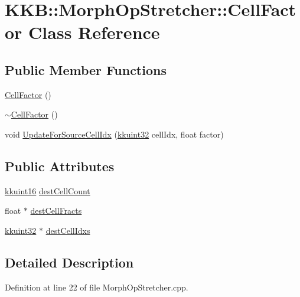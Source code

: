\hypertarget{class_morph_op_stretcher_1_1_cell_factor}{}\section{K\+KB\+:\+:Morph\+Op\+Stretcher\+:\+:Cell\+Factor Class Reference}
\label{class_morph_op_stretcher_1_1_cell_factor}
\subsection*{Public Member Functions}
\begin{DoxyCompactItemize}
\item 
\hyperlink{class_morph_op_stretcher_1_1_cell_factor_af7b5fd53ab9efc21af36ae9fb8186c39}{Cell\+Factor} ()
\item 
\hyperlink{class_morph_op_stretcher_1_1_cell_factor_a72f0f29acfccf22fef775cfc5b23344d}{$\sim$\+Cell\+Factor} ()
\item 
void \hyperlink{class_morph_op_stretcher_1_1_cell_factor_a42f00b31427b26dc6409b75eaa581e03}{Update\+For\+Source\+Cell\+Idx} (\hyperlink{namespace_k_k_b_af8d832f05c54994a1cce25bd5743e19a}{kkuint32} cell\+Idx, float factor)
\end{DoxyCompactItemize}
\subsection*{Public Attributes}
\begin{DoxyCompactItemize}
\item 
\hyperlink{namespace_k_k_b_aa8c7d4d30381c8a0b6fce68974a9c8a9}{kkuint16} \hyperlink{class_morph_op_stretcher_1_1_cell_factor_a4ea39788e14a1b8d0ea4bf0634991f81}{dest\+Cell\+Count}
\item 
float $\ast$ \hyperlink{class_morph_op_stretcher_1_1_cell_factor_aaa0ecc31b4ade20727b2a6fa61bf938c}{dest\+Cell\+Fracts}
\item 
\hyperlink{namespace_k_k_b_af8d832f05c54994a1cce25bd5743e19a}{kkuint32} $\ast$ \hyperlink{class_morph_op_stretcher_1_1_cell_factor_ad98db8b4eb2b3513ad0a592250bacc06}{dest\+Cell\+Idxs}
\end{DoxyCompactItemize}


\subsection{Detailed Description}


Definition at line 22 of file Morph\+Op\+Stretcher.\+cpp.



